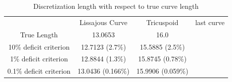 \begin{table}[h!]
\caption{\label{tab:curvelength} Discretization length with respect to true curve length}
\begin{tabular}{cccc}
 & Lissajous Curve & Tricuspoid & last curve \\
True Length & 13.0653 & 16.0 & \\
10\% deficit criterion & 12.7123 (2.7\%) & 15.5885 (2.5\%) & \\
1\% deficit criterion & 12.8844 (1.3\%)& 15.8745 (0.78\%) & \\
0.1\% deficit criterion & 13.0436 (0.166\%) & 15.9906 (0.059\%) & 
\end{tabular}
\end{table}
